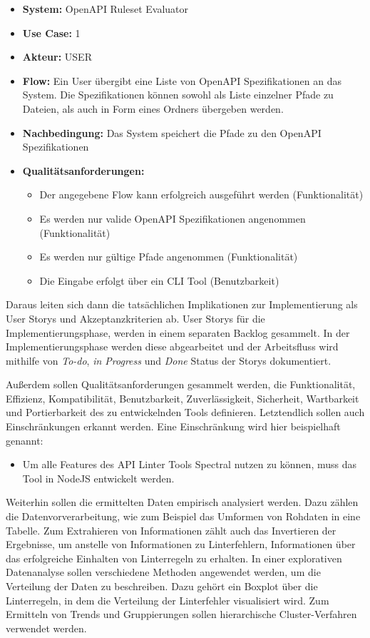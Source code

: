 \begin{itemize}
    \item \textbf{System:} OpenAPI Ruleset Evaluator
    \item \textbf{Use Case:} 1
    \item \textbf{Akteur:} USER
    \item \textbf{Flow:} Ein User übergibt eine Liste von OpenAPI Spezifikationen an das System. Die Spezifikationen können sowohl als Liste einzelner Pfade zu Dateien, als auch in Form eines Ordners übergeben werden.
    \item \textbf{Nachbedingung:} Das System speichert die Pfade zu den OpenAPI Spezifikationen
    \item \textbf{Qualitätsanforderungen:}
    \begin{itemize}
        \item Der angegebene Flow kann erfolgreich ausgeführt werden (Funktionalität)
        \item Es werden nur valide OpenAPI Spezifikationen angenommen (Funktionalität)
        \item Es werden nur gültige Pfade angenommen (Funktionalität)
        \item Die Eingabe erfolgt über ein CLI Tool (Benutzbarkeit)
    \end{itemize}
\end{itemize}

Daraus leiten sich dann die tatsächlichen Implikationen zur Implementierung als User Storys und Akzeptanzkriterien ab. User Storys für die Implementierungsphase, werden in einem separaten Backlog gesammelt. In der Implementierungsphase werden diese abgearbeitet und der Arbeitsfluss wird mithilfe von \textit{To-do}, \textit{in Progress} und \textit{Done} Status der Storys dokumentiert.

Außerdem sollen Qualitätsanforderungen gesammelt werden, die Funktionalität, Effizienz, Kompatibilität, Benutzbarkeit, Zuverlässigkeit, Sicherheit, Wartbarkeit und Portierbarkeit des zu entwickelnden Tools definieren. Letztendlich sollen auch Einschränkungen erkannt werden. Eine Einschränkung wird hier beispielhaft genannt:

\begin{itemize}
    \item Um alle Features des API Linter Tools Spectral nutzen zu können, muss das Tool in NodeJS entwickelt werden.
\end{itemize}

Weiterhin sollen die ermittelten Daten empirisch analysiert werden. Dazu zählen die Datenvorverarbeitung, wie zum Beispiel das Umformen von Rohdaten in eine Tabelle. Zum Extrahieren von Informationen zählt  auch das Invertieren der Ergebnisse, um anstelle von Informationen zu Linterfehlern, Informationen über das erfolgreiche Einhalten von Linterregeln zu erhalten. In einer explorativen Datenanalyse sollen verschiedene Methoden angewendet werden, um die Verteilung der Daten zu beschreiben. Dazu gehört ein Boxplot über die Linterregeln, in dem die Verteilung der Linterfehler visualisiert wird. Zum Ermitteln von Trends und Gruppierungen sollen hierarchische Cluster-Verfahren verwendet werden.

